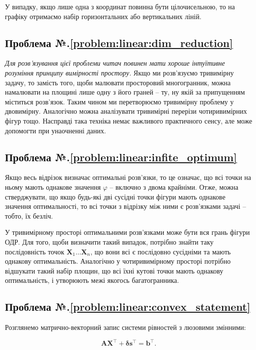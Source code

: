 \documentclass[\main/book.tex]{subfiles}
\begin{document}
У випадку, якщо лише одна з координат повинна бути цілочисельною, то на графіку отримаємо набір горизонтальних або вертикальних ліній.

\subsection*{Проблема №.\ref{problem:linear:dim_reduction}}

\textit{Для розв'язування цієї проблеми читач повинен мати хороше інтуїтивне розуміння принципу вимірності простору.} Якщо ми розв'язуємо тривимірну задачу, то замість того, щоби малювати просторовий многогранник, можна намалювати на площині лише одну з його граней -- ту, ну якій за припущенням міститься розв'язок. Таким чином ми перетворюємо тривимірну проблему у двовимірну. Аналогічно можна аналізувати тривимірні перерізи чотиривимірних фігур тощо. Насправді така техніка немає важливого практичного сенсу, але може допомогти при унаочненні даних.

\subsection*{Проблема №.\ref{problem:linear:infite_optimum}}

Якщо весь відрізок визначає оптимальні розв'язки, то це означає, що всі точки на ньому мають однакове значення $\varphi$ -- включно з двома крайніми. Отже, можна стверджувати, що якщо будь-які дві сусідні точки фігури мають однакове значення оптимальності, то всі точки з відрізку між ними є розв'язками задачі -- тобто, їх безліч.

У тривимірному просторі оптимальними розв'язками може бути вся грань фігури ОДР. Для того, щоби визначити такий випадок, потрібно знайти таку послідовність точок $\mathbf{X}_1 \ldots \mathbf{X}_n$, що вони всі є послідовно сусідніми та мають однакову оптимальність. Аналогічно у чотиривимірному просторі потрібно відшукати такий набір площин, що всі їхні кутові точки мають однакову оптимальність, і утворюють межі якогось багатогранника.

\subsection*{Проблема №.\ref{problem:linear:convex_statement}}

Розглянемо матрично-векторний запис системи рівностей з люзовими змінними:

\[
 \mathbf{A} \mathbf{X}^\top + \mathbf{\delta} \mathbf{s}^\top = \mathbf{b}^\top\text{.}
\]
\end{document}

